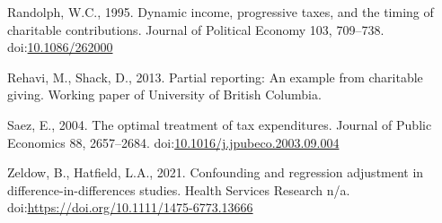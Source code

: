 \documentclass[
  11pt,
  a4paper,
]{article}
\newlength{\cslhangindent}
\newlength{\cslentryspacingunit} %
\newenvironment{CSLReferences}[2] %
 {%
  \setlength{\parindent}{0pt}
  \ifodd #1
  \let\oldpar\par
  \def\par{\hangindent=\cslhangindent\oldpar}
  \fi
  \setlength{\parskip}{#2\cslentryspacingunit}
 }%
 {}
\begin{document}
\begin{CSLReferences}{1}{0}
\leavevmode\hypertarget{ref-Randolph1995}{}%
Randolph, W.C., 1995. Dynamic income, progressive taxes, and the timing of charitable contributions. Journal of Political Economy 103, 709--738. doi:\href{https://doi.org/10.1086/262000}{10.1086/262000}

\leavevmode\hypertarget{ref-Rehavi2013}{}%
Rehavi, M., Shack, D., 2013. Partial reporting: An example from charitable giving. Working paper of University of British Columbia.

\leavevmode\hypertarget{ref-Saez2004}{}%
Saez, E., 2004. The optimal treatment of tax expenditures. Journal of Public Economics 88, 2657--2684. doi:\href{https://doi.org/10.1016/j.jpubeco.2003.09.004}{10.1016/j.jpubeco.2003.09.004}

\leavevmode\hypertarget{ref-Zeldow2019}{}%
Zeldow, B., Hatfield, L.A., 2021. Confounding and regression adjustment in difference-in-differences studies. Health Services Research n/a. doi:\url{https://doi.org/10.1111/1475-6773.13666}

\end{CSLReferences}
\end{document}
